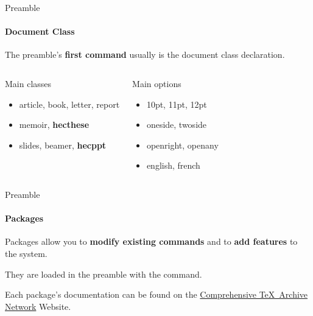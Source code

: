 \begin{frame}[fragile]{Preamble}
	\framesubtitle{Document Class}
	The preamble's \textbf{first command} usually is the document class declaration.
	

	\begin{columns}
		
		\pause
		
		\begin{HECcomparaison}{Main classes}
			\begin{itemize}
				\item article, book, letter, report
				\item memoir, \textbf{hecthese}
				\item slides, beamer, \textbf{hecppt}
			\end{itemize}
		\end{HECcomparaison}
	
		\pause
		
		\begin{HECcomparaison}{Main options}
			\begin{itemize}
				\item 10pt, 11pt, 12pt
				\item oneside, twoside
				\item openright, openany
				\item english, french
			\end{itemize}
		\end{HECcomparaison}
	\end{columns}
\end{frame}

\begin{frame}[fragile,c]{Preamble}
	\framesubtitle{Packages}
	Packages allow you to \textbf{modify existing commands} and to \textbf{add features} to the system.
	
	They are loaded in the preamble with the  command.
	

	Each package's documentation can be found on the 
	\href{https://ctan.org/}{Comprehensive \TeX\ Archive Network} Website.
\end{frame}


